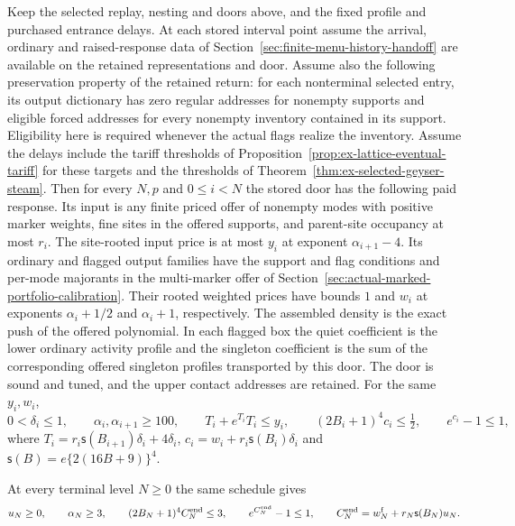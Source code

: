 \begin{proposition}
\label{prop:selected-centered-retention}
Keep the selected replay, nesting and doors above, and the fixed
profile and purchased entrance delays. At each stored interval point
assume the arrival, ordinary and raised-response
data of Section~\ref{sec:finite-menu-history-handoff}
are available on the retained representations and door. Assume also
the following preservation property of the retained return: for each
nonterminal selected entry, its output dictionary has zero regular
addresses for nonempty supports and eligible forced addresses for
every nonempty inventory contained in its support. Eligibility here
is required whenever the actual flags realize the inventory. Assume the delays include the tariff thresholds of
Proposition~\ref{prop:ex-lattice-eventual-tariff} for these targets and
the thresholds of Theorem~\ref{thm:ex-selected-geyser-steam}.
Then for every $N,p$ and $0\le i<N$ the stored door has the following
paid response. Its input is any finite priced offer of nonempty modes
with positive marker weights, fine sites in the offered supports, and
parent-site occupancy at most $r_i$. The site-rooted input price is at
most $y_i$ at exponent $\alpha_{i+1}-4$. Its ordinary and flagged
output families have the support and flag conditions and per-mode
majorants in the multi-marker offer of
Section~\ref{sec:actual-marked-portfolio-calibration}.
Their rooted weighted prices have bounds $1$ and $w_i$ at exponents
$\alpha_i+1/2$ and $\alpha_i+1$, respectively. The assembled density is
the exact push of the offered polynomial. In each flagged box the
quiet coefficient is the lower ordinary activity profile and the
singleton coefficient is the sum of the corresponding offered
singleton profiles transported by this door. The door is sound and
tuned, and the upper contact addresses are retained. For the same $y_i,w_i$,
\[
 0<\delta_i\le1,\qquad \alpha_i,\alpha_{i+1}\ge100,\qquad
 T_i+e^{T_i}T_i\le y_i,\qquad
 (2B_i+1)^4c_i\le\tfrac12,\qquad e^{c_i}-1\le1,
\]
where $T_i=r_i\mathsf s(B_{i+1})\delta_i+4\delta_i$,
$c_i=w_i+r_i\mathsf s(B_i)\delta_i$ and
$\mathsf s(B)=e\{2(16B+9)\}^4$.

At every terminal level $N\ge0$ the same schedule gives
\[
 u_N\ge0,\qquad \alpha_N\ge3,\qquad
 (2B_N+1)^4 C_N^{\rm end}\le3,\qquad e^{C_N^{\rm end}}-1\le1,
 \qquad
 C_N^{\rm end}=w_N^{\mathrm f}+r_N\mathsf s(B_N)u_N.
\]
\end{proposition}

